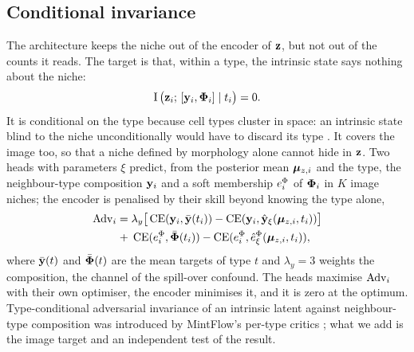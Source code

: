 \subsection{Conditional invariance}
\label{sec:invariance}

The architecture keeps the niche out of the encoder of $\mathbf{z}$, but not out of the counts it reads. The target is that, within a type, the intrinsic state says nothing about the niche:
\begin{equation}
  \operatorname{I}\big(\mathbf{z}_i;\, [\mathbf{y}_i, \boldsymbol{\Phi}_i] \mid t_i\big) = 0.
  \label{eq:invariance-target}
\end{equation}
It is conditional on the type because cell types cluster in space: an intrinsic state blind to the niche unconditionally would have to discard its type \citep{zhao2019inherent}. It covers the image too, so that a niche defined by morphology alone cannot hide in $\mathbf{z}$. Two heads with parameters $\xi$ predict, from the posterior mean $\boldsymbol{\mu}_{z,i}$ and the type, the neighbour-type composition $\mathbf{y}_i$ and a soft membership $e^{\Phi}_i$ of $\boldsymbol{\Phi}_i$ in $K$ image niches; the encoder is penalised by their skill beyond knowing the type alone,
\begin{equation}
\begin{split}
  \mathrm{Adv}_i = \;&\lambda_y\big[\operatorname{CE}(\mathbf{y}_i, \bar{\mathbf{y}}(t_i)) - \operatorname{CE}(\mathbf{y}_i, \hat{\mathbf{y}}_\xi(\boldsymbol{\mu}_{z,i}, t_i))\big] \\
  +\;&\operatorname{CE}(e^{\Phi}_i, \bar{\boldsymbol{\Phi}}(t_i)) - \operatorname{CE}(e^{\Phi}_i, \hat{e}^{\Phi}_\xi(\boldsymbol{\mu}_{z,i}, t_i)),
\end{split}
\label{eq:adv}
\end{equation}
where $\bar{\mathbf{y}}(t)$ and $\bar{\boldsymbol{\Phi}}(t)$ are the mean targets of type $t$ and $\lambda_y = 3$ weights the composition, the channel of the spill-over confound. The heads maximise $\mathrm{Adv}_i$ with their own optimiser, the encoder minimises it, and it is zero at the optimum. Type-conditional adversarial invariance of an intrinsic latent against neighbour-type composition was introduced by MintFlow's per-type critics \citep{akbarnejad2025mintflow}; what we add is the image target and an independent test of the result.

